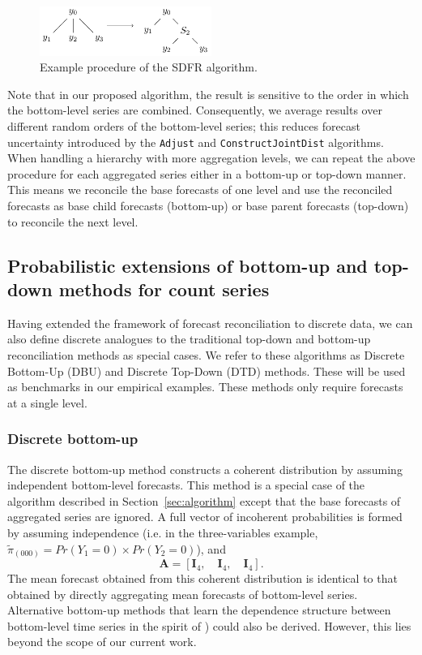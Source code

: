 \documentclass[a4paper,review,12pt,authoryear]{elsarticle}
\let\code=\texttt
\theoremstyle{definition}
\begin{document}
  \begin{figure}
    \centering
    \includegraphics[width=0.5\textwidth]{figures/sdfr.pdf}
    \caption{\label{fig:sdfr}Example procedure of the SDFR algorithm.}
  \end{figure}

  Note that in our proposed algorithm, the result is sensitive to the order in which the bottom-level series are combined. Consequently, we average results over different random orders of the bottom-level series; this reduces forecast uncertainty introduced by the \code{Adjust} and \code{ConstructJointDist} algorithms.
  When handling a hierarchy with more aggregation levels, we can repeat the above procedure for each aggregated series either in a bottom-up or top-down manner. This means we reconcile the base forecasts of one level and use the reconciled forecasts as base child forecasts (bottom-up) or base parent forecasts (top-down) to reconcile the next level.



    \subsection{Probabilistic extensions of bottom-up and top-down methods for count series}

    Having extended the framework of forecast reconciliation to discrete data, we can also define discrete analogues to the traditional top-down and bottom-up reconciliation methods as special cases. We refer to these algorithms as Discrete Bottom-Up (DBU) and Discrete Top-Down (DTD) methods. These will be used as benchmarks in our empirical examples. These methods only require forecasts at a single level.
    
    \subsubsection*{\textbf{Discrete bottom-up}}
    \label{sec:bottomup}

    The discrete bottom-up method constructs a coherent distribution by assuming independent bottom-level forecasts.
    This method is a special case of the algorithm described in Section~\ref{sec:algorithm} except that the base forecasts of aggregated series are ignored. A full vector of incoherent probabilities is formed by assuming independence (i.e. in the three-variables example, $\tilde{\pi}_{(000)} = Pr(Y_1=0)\times Pr(Y_2=0)$), and \[
    \mathbf{A} = [\mathbf{I}_4, \quad \mathbf{I}_4, \quad \mathbf{I}_4 ].
    \]
    The mean forecast obtained from this coherent distribution is identical to that obtained by directly aggregating mean forecasts of bottom-level series. Alternative bottom-up methods that learn the dependence structure between bottom-level time series in the spirit of \citealp{bentaiebHierarchicalProbabilisticForecasting2020}) could also be derived. However, this lies beyond the scope of our current work.
    
\end{document}
